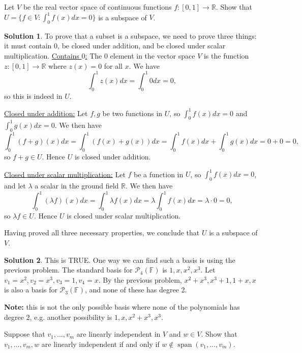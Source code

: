 \documentclass[12pt]{article}
\theoremstyle{definition}
\theoremstyle{definition}
\newtheorem*{soln}{Solution}
\newcommand{\R}{\mathbb{R}}
\newcommand{\F}{\mathbb{F}}
\newcommand{\Span}{\operatorname{span}}
\begin{document}
\begin{prob}
Let $V$ be the real vector space of continuous functions $f:[0,1]\to\R$. Show that $U=\{f\in V:\int_0^1 f(x)dx= 0\}$ is a subspace of $V$.
\end{prob}

\begin{soln}
To prove that a subset is a subspace, we need to prove three things: it must contain $0$, be closed under addition, and be closed under scalar multiplication.
\underline{Contains $0$:} The $0$ element in the vector space $V$ is the function $z:[0,1]\to\R$ where $z(x)=0$ for all $x$. We have
\[\int_0^1 z(x)dx = \int_0^1 0dx = 0,\]
so this is indeed in $U$.

\underline{Closed under addition:} Let $f,g$ be two functions in $U$, so $\int_0^1 f(x)dx=0$ and $\int_0^1 g(x)dx=0$. We then have
\[\int_0^1 (f+g)(x)dx = \int_0^1 (f(x)+g(x))dx = \int_0^1 f(x)dx+\int_0^1 g(x)dx = 0+0=0,\]
so $f+g\in U$. Hence $U$ is closed under addition.

\underline{Closed under scalar multiplication:} Let $f$ be a function in $U$, so $\int_0^1 f(x)dx=0$, and let $\lambda$ a scalar in the ground field $\R$. We then have
\[\int_0^1 (\lambda f)(x) dx = \int_0^1 \lambda f(x)dx = \lambda \int_0^1 f(x)dx = \lambda\cdot 0 = 0,\]
so $\lambda f\in U$. Hence $U$ is closed under scalar multiplication.

Having proved all three necessary properties, we conclude that $U$ is a subspace of $V$.
\end{soln}


\begin{soln}
This is TRUE. One way we can find such a basis is using the previous problem. The standard basis for $\mathcal{P}_4(\F)$ is $1,x,x^2,x^3$. Let $v_1=x^2,v_2=x^3,v_3=1,v_4=x$. By the previous problem, $x^2+x^3,x^3+1,1+x,x$ is also a basis for $\mathcal{P}_3(\F)$, and none of these has degree 2.

\textbf{Note:} this is not the only possible basis where none of the polynomials has degree 2, e.g. another possibility is $1,x,x^2+x^3,x^3$.
\end{soln}

\break

\begin{prob}[Axler  2.A.11]
Suppose  that $v_1,\ldots,v_m$ are  linearly  independent  in $V$ and $w\in V$.   Show  that $v_1,\ldots,v_m, w$ are linearly independent if and only if $w\notin\Span(v_1,\ldots,v_m)$.
\end{prob}
\end{document}
